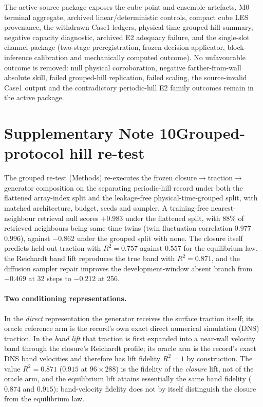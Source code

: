 \documentclass[11pt]{article}
\begin{document}
The active source package exposes the cube point and ensemble artefacts, M0 terminal aggregate,
archived linear/deterministic controls, compact cube LES provenance, the withdrawn Case1
ledgers, physical-time-grouped hill summary, negative capacity diagnostic, archived E2
adequacy failure, and the single-slot channel package (two-stage preregistration, frozen
decision applicator, block-inference calibration and mechanically computed outcome). No
unfavourable outcome is removed: null physical corroboration, negative farther-from-wall absolute
skill, failed grouped-hill replication, failed scaling, the source-invalid Case1 output and the
contradictory periodic-hill E2 family outcomes
remain in the active package.

\section*{Supplementary Note 10\quad Grouped-protocol hill re-test}
\label{sec:s-retest}

The grouped re-test (Methods) re-executes the frozen
closure$\rightarrow$traction$\rightarrow$generator composition on the separating periodic-hill
record under both the flattened array-index split and the leakage-free physical-time-grouped
split, with matched architecture, budget, seeds and sampler. A training-free nearest-neighbour
retrieval null scores $+0.983$ under the flattened split, with $88\%$ of retrieved neighbours
being same-time twins (twin fluctuation correlation $0.977$--$0.996$), against $-0.862$ under the
grouped split with none. The closure itself predicts held-out traction with $R^2=0.757$ against
$0.557$ for the equilibrium law, the Reichardt band lift reproduces the true band with
$R^2=0.871$, and the diffusion sampler repair improves the development-window absent branch from
$-0.469$ at 32 steps to $-0.212$ at 256.

\paragraph{Two conditioning representations.} In the \emph{direct} representation the generator
receives the surface traction itself; its oracle reference arm is the
record's own exact direct numerical simulation (DNS) traction. In the \emph{band lift} that traction is first expanded into a
near-wall velocity band through the closure's Reichardt profile; its oracle arm
is the record's exact DNS band velocities and therefore has lift fidelity
$R^2=1$ by construction. The value $R^2=0.871$ ($0.915$ at $96\times288$) is the fidelity of the
\emph{closure} lift, not of the oracle arm, and the equilibrium lift attains essentially the same
band fidelity ($0.874$ and $0.915$): band-velocity fidelity does not by itself distinguish the
closure from the equilibrium law.
\end{document}
